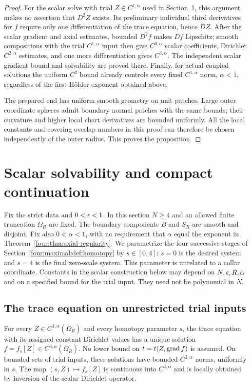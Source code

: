 \begin{proof}
For the scalar solve with trial $Z\in C^{1,\alpha}$ used in
Section~\ref{four:maximal:sec:existence}, this argument makes no assertion that
$D^2Z$ exists.  Its preliminary individual third derivatives for
$f$ require only one differentiation of the trace equation, hence
$DZ$.  After the scalar gradient and axial estimates, bounded
$D^2f$ makes $Df$ Lipschitz; smooth compositions with the trial
$C^{1,\alpha}$ input then give $C^{0,\alpha}$ scalar coefficients,
Dirichlet $C^{2,\alpha}$ estimates, and one more differentiation
gives $C^{3,\alpha}$.  The independent scalar gradient bound and
solvability are proved there.  Finally, for actual coupled solutions
the uniform $C^2$ bound already controls every fixed
$C^{1,\alpha}$ norm, $\alpha<1$, regardless of the first H\"older
exponent obtained above.

The prepared end has uniform smooth geometry on unit patches.
Large outer coordinate spheres admit boundary normal patches with
the same bounds; their curvature and higher local chart derivatives
are bounded uniformly.  All the local constants and covering
overlap numbers in this proof can therefore be chosen independently
of the outer radius.  This proves the proposition.
\end{proof}

\section{Scalar solvability and compact continuation}\label{four:maximal:sec:existence}

Fix the strict data and $0<\epsilon<1$.  In this section $N\ge4$ and an
allowed finite truncation $\Omega_R$ are fixed.  The boundary components
$B$ and $S_R$ are smooth and disjoint.  Fix also $0<\alpha<1$, with no
requirement that $\alpha$ equal the exponent in
Theorem~\ref{four:thm:axial-regularity}.  We parametrize the four successive
stages of Section~\ref{four:maximal:def:homotopy} by $s\in[0,4]$: $s=0$ is the
desired system and $s=4$ is the final zero-scale system.  This parameter
is unrelated to a collar coordinate.  Constants in the scalar
construction below may depend on $N,\epsilon,R,\alpha$ and on a specified
bound for the trial input.  They need not be polynomial in $N$.

\subsection{The trace equation on unrestricted trial inputs}

\begin{proposition}\label{four:maximal:prop:scalar-solve}
For every $Z\in C^{1,\alpha}(\overline\Omega_R)$ and every homotopy
parameter $s$, the trace equation with its assigned constant Dirichlet
values has a unique solution $f=f_s[Z]\in
C^{3,\alpha}(\overline\Omega_R)$.  No lower bound on
$t=t(Z,\operatorname{grad} f)$ is assumed.  On bounded sets of trial inputs, these
solutions have bounded $C^{3,\alpha}$ norms, uniformly in $s$.  The
map $(s,Z)\mapsto f_s[Z]$ is continuous into $C^{3,\alpha}$ and is
locally obtained by inversion of the scalar Dirichlet operator.
\end{proposition}

